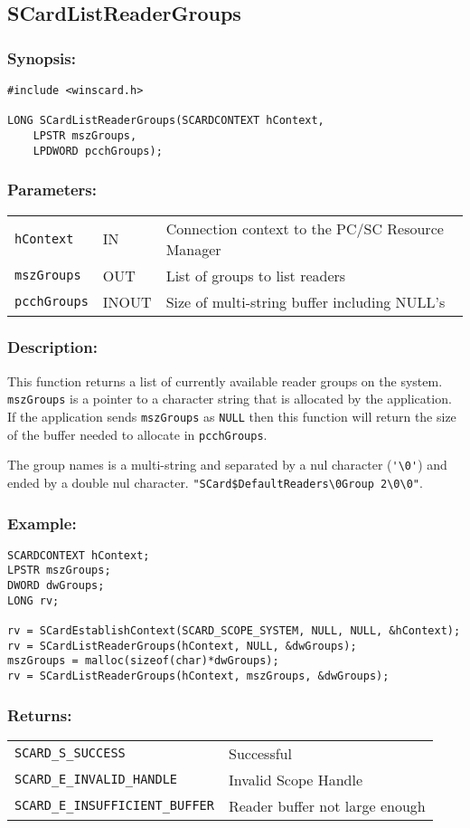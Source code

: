 \documentclass[a4paper,12pt]{article}
\newcommand{\synopsis}{\subsubsection{Synopsis:}}
\newcommand{\parameters}{\subsubsection{Parameters:}}
\newcommand{\desc}{\subsubsection{Description:}}
\newcommand{\example}{\subsubsection{Example:}}
\newcommand{\returns}{\subsubsection{Returns:}}
\begin{document}
\subsection{SCardListReaderGroups}

\synopsis
\begin{verbatim}
#include <winscard.h>

LONG SCardListReaderGroups(SCARDCONTEXT hContext,
    LPSTR mszGroups,
    LPDWORD pcchGroups);
\end{verbatim}

\parameters

\begin{tabular}{lll}
\texttt{hContext} & IN & Connection context to the PC/SC Resource Manager\\
\texttt{mszGroups} & OUT & List of groups to list readers\\
\texttt{pcchGroups} & INOUT & Size of multi-string buffer including NULL's
\end{tabular}

\desc

This function returns a list of currently available reader groups on the
system. \texttt{mszGroups} is a pointer to a character string that is
allocated by the application. If the application sends
\texttt{mszGroups} as \texttt{NULL} then this function will return the
size of the buffer needed to allocate in \texttt{pcchGroups}.

The group names is a multi-string and separated by a nul character
(\verb+'\0'+) and ended by a double nul character.
\verb+"SCard$DefaultReaders\0Group 2\0\0"+.

\example
\begin{verbatim}
SCARDCONTEXT hContext;
LPSTR mszGroups;
DWORD dwGroups;
LONG rv;

rv = SCardEstablishContext(SCARD_SCOPE_SYSTEM, NULL, NULL, &hContext);
rv = SCardListReaderGroups(hContext, NULL, &dwGroups);
mszGroups = malloc(sizeof(char)*dwGroups);
rv = SCardListReaderGroups(hContext, mszGroups, &dwGroups);
\end{verbatim}

\returns

\begin{tabular}{ll}
\texttt{SCARD\_S\_SUCCESS} & Successful \\
\texttt{SCARD\_E\_INVALID\_HANDLE} & Invalid Scope Handle\\
\texttt{SCARD\_E\_INSUFFICIENT\_BUFFER} & Reader buffer not large enough
\end{tabular}
\end{document}
